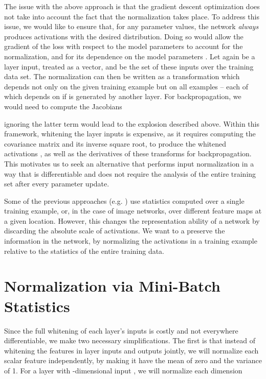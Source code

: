 \documentclass[twocolumn]{article}
\begin{document}
The issue with the above approach is that the gradient descent
optimization does not take into account the fact that the
normalization takes place.  To address this issue, we would like to
ensure that, for any parameter values, the network {\em always}
produces activations with the desired distribution. Doing so would
allow the gradient of the loss with respect to the model parameters to
account for the normalization, and for its dependence on the model
parameters . Let again  be a layer input, treated as a
vector, and  be the set of these inputs over the training data
set. The normalization can then be written as a transformation
 which depends not only on the given
training example  but on all examples  -- each of which
depends on  if  is generated by another layer. For
backpropagation, we would need to compute the Jacobians

ignoring the latter term would lead to the explosion described above.
Within this framework, whitening the layer inputs is expensive, as it requires
computing the covariance matrix  and its
inverse square root, to produce the whitened activations ,
as well as the derivatives of these transforms for backpropagation.
 This motivates us to seek an
alternative that performs input normalization in a way that is
differentiable and does not require the analysis of the entire
training set after every parameter update.



Some of the previous approaches
(e.g. \cite{lyu-simoncelli}) use statistics computed over a single
training example, or, in the case of image networks, over different
feature maps at a given location. However, this changes the
representation ability of a network by discarding the absolute scale
of activations. We want to a preserve the information in the network,
by normalizing the activations in a training example relative to the
statistics of the entire training data.

\section{Normalization via Mini-Batch Statistics}


Since the full whitening of each layer's inputs is costly and not
everywhere differentiable, we make two necessary simplifications. The first
 is that instead of whitening the features in layer
inputs and outputs jointly, we will normalize each scalar feature
independently, by making it have the mean of zero and the variance of
1. For a layer with -dimensional input , we
will normalize each dimension 
\end{document}

